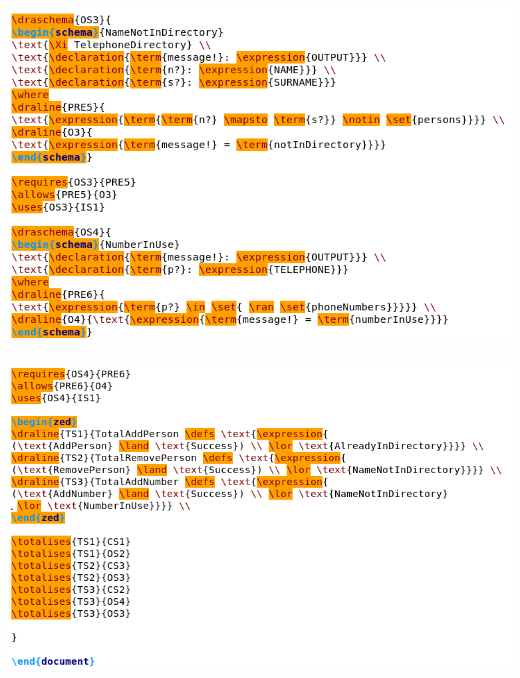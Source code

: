 \noindent \includegraphics[scale=0.5]{examples/nonworkzcga/1n2imagef.png}

\noindent \includegraphics[scale=0.5]{examples/nonworkzcga/1n2imageg.png}

